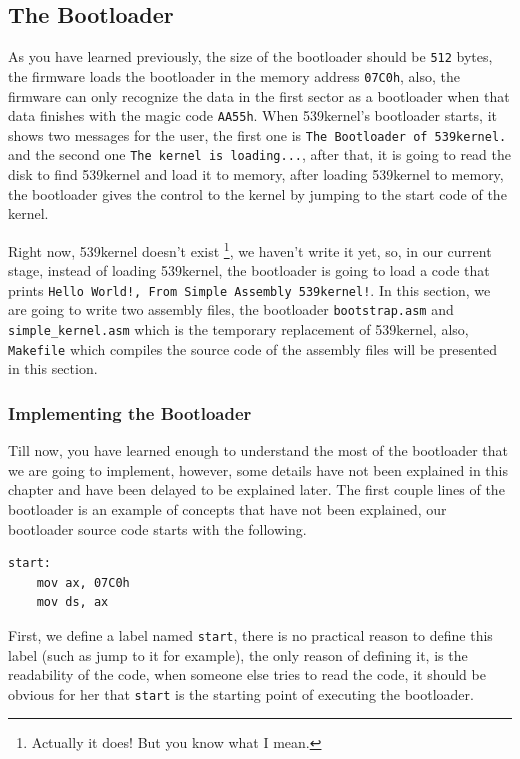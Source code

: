 \subsection{The Bootloader}\label{the-bootloader}

As you have learned previously, the size of the bootloader should be
\lstinline!512! bytes, the firmware loads the bootloader in the memory
address \lstinline!07C0h!, also, the firmware can only recognize the
data in the first sector as a bootloader when that data finishes with
the magic code \lstinline!AA55h!. When 539kernel's bootloader starts, it
shows two messages for the user, the first one is
\lstinline!The Bootloader of 539kernel.! and the second one
\lstinline!The kernel is loading...!, after that, it is going to read
the disk to find 539kernel and load it to memory, after loading
539kernel to memory, the bootloader gives the control to the kernel by
jumping to the start code of the kernel.

Right now, 539kernel doesn't exist \footnote{Actually it does! But you
  know what I mean.}, we haven't write it yet, so, in our current stage,
instead of loading 539kernel, the bootloader is going to load a code
that prints \lstinline"Hello World!, From Simple Assembly 539kernel!".
In this section, we are going to write two assembly files, the
bootloader \lstinline!bootstrap.asm! and \lstinline!simple_kernel.asm!
which is the temporary replacement of 539kernel, also,
\lstinline!Makefile! which compiles the source code of the assembly
files will be presented in this section.

\subsubsection{Implementing the
Bootloader}\label{implementing-the-bootloader}

Till now, you have learned enough to understand the most of the
bootloader that we are going to implement, however, some details have
not been explained in this chapter and have been delayed to be explained
later. The first couple lines of the bootloader is an example of
concepts that have not been explained, our bootloader source code starts
with the following.

\begin{lstlisting}
start:
    mov ax, 07C0h
    mov ds, ax
\end{lstlisting}

First, we define a label named \lstinline!start!, there is no practical
reason to define this label (such as jump to it for example), the only
reason of defining it, is the readability of the code, when someone else
tries to read the code, it should be obvious for her that
\lstinline!start! is the starting point of executing the bootloader.

